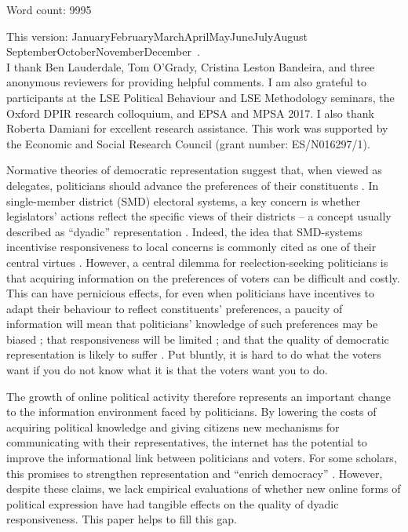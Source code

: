 \documentclass[12pt]{article}
\def\monthname{\ifcase\month\or
January\or February\or March\or April\or May\or June\or July\or August\or
September\or October\or November\or December\fi} \makeatother
\begin{document}
\begin{titlepage}
Word count: 9995

\vfill
  \footnoterule
    {\footnotesize
\noindent 	
	This version: \monthname \ \number\year. \\ I thank Ben Lauderdale, Tom O'Grady, Cristina Leston Bandeira, and three anonymous reviewers for providing helpful comments. I am also grateful to participants at the LSE Political Behaviour and LSE Methodology seminars, the Oxford DPIR research colloquium, and EPSA and MPSA 2017. I also thank Roberta Damiani for excellent research assistance. This work was supported by the Economic and Social Research Council (grant number: ES/N016297/1).
	



\noindent\footnotesize

}
\end{titlepage}

\newpage
\setcounter{page}{1} \addtolength{\baselineskip}{0.5\baselineskip}

\noindent Normative theories of democratic representation suggest that, when viewed as delegates, politicians should advance the preferences of their constituents \citep{pitkin1967concept}. In single-member district (SMD) electoral systems, a key concern is whether legislators' actions reflect the specific views of their districts -- a concept usually described as ``dyadic'' representation \citep{weissberg1978collective}. Indeed, the idea that SMD-systems incentivise responsiveness to local concerns is commonly cited as one of their central virtues \citep{norris2001twilight, carey2011electoral}. However, a central dilemma for reelection-seeking politicians is that acquiring information on the preferences of voters can be difficult and costly. This can have pernicious effects, for even when politicians have incentives to adapt their behaviour to reflect constituents' preferences, a paucity of information will mean that politicians' knowledge of such preferences may be biased \citep{norris2004parties,broockman2018bias}; that responsiveness will be limited \citep{stimson1995dynamic}; and that the quality of democratic representation is likely to suffer \citep[518]{mansbridge2003rethinking}. Put bluntly, it is hard to do what the voters want if you do not know what it is that the voters want you to do. 

The growth of online political activity therefore represents an important change to the information environment faced by politicians. By lowering the costs of acquiring political knowledge and giving citizens new mechanisms for communicating with their representatives, the internet has the potential to improve the informational link between politicians and voters. For some scholars, this promises to strengthen representation and ``enrich democracy'' \citep[11]{coleman2009internet}. However, despite these claims, we lack empirical evaluations of whether new online forms of political expression have had tangible effects on the quality of dyadic responsiveness. This paper helps to fill this gap. 
\end{document}
